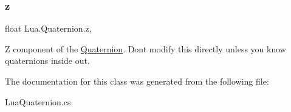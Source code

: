 \mbox{\label{class_lua_1_1_quaternion_ac26c0a2710dd86783dee62c8645ee55c}} 
\subsubsection{\texorpdfstring{z}{z}}
{\footnotesize\ttfamily float Lua.\+Quaternion.\+z\hspace{0.3cm}{\ttfamily [get]}, {\ttfamily [set]}}



Z component of the \mbox{\hyperlink{class_lua_1_1_quaternion}{Quaternion}}. Don\textquotesingle{}t modify this directly unless you know quaternions inside out. 



The documentation for this class was generated from the following file\+:\begin{DoxyCompactItemize}
\item 
Lua\+Quaternion.\+cs\end{DoxyCompactItemize}
